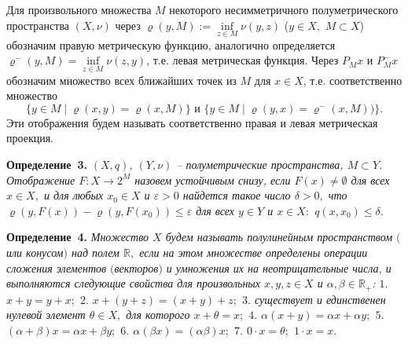 \documentclass{vzmsthesis}
\begin{document}
Для произвольного множества $M$   некоторого    несимметричного   полуметрического пространства $(X,\nu) $ через $\varrho(y,M):=\inf\limits_{z\in M}\nu(y,z)$ ($y\in X,$ $M\subset X$) обозначим правую метрическую функцию, аналогично определяется   $\varrho^-(y,M)=\inf\limits_{z\in M}\nu(z,y)$, т.е. левая метрическая функция.
  Через $P_Mx$ и $P_M^-x$ обозначим множество всех ближайших точек из $M$ для $x\in X$, т.е. соответственно множество $$\{y\in M\mid \varrho(x,y)=\varrho(x,M)\} \mbox{ и }\{y\in M\mid \varrho(y,x)=\varrho^-(x,M))\}.$$ Эти отображения будем называть соответственно правая и левая метрическая проекция.

\textbf{Определение~3.} {\it
 $(X,q)$, $(Y,\nu) $ -- полуметрические
пространства, $M\subset Y$. Отображение $F:X\rightarrow 2^M$
назовем устойчивым снизу, если $F(x)\neq \emptyset$ для всех $x\in
X,$  и для любых $x_0\in X$  и $\varepsilon>0$ найдется такое
число $\delta>0,$ что
$\varrho(y,F(x))-\varrho(y,F(x_0))\leqslant\varepsilon$ для всех
$y\in Y$ и $x\in X:$ $q(x,x_0)\leqslant\delta$.}

\textbf{Определение~4.} {\it
Множество $X$ будем называть полулинейным пространством $($или конусом$)$ над полем $\mathbb{R},$ если на этом множестве определены операции сложения элементов $($векторов$)$ и умножения их на неотрицательные числа, и выполняются следующие свойства для произвольных $x,y,z\in X$ и $\alpha,\beta\in \mathbb{R}_+$:
$1.$ $x+y=y+x;$
$2.$ $x+(y+z)=(x+y)+z;$
$3.$ существует и единственен нулевой элемент $\theta\in X,$ для которого $x+\theta=x;$
$4.$ $\alpha(x+y)=\alpha x+\alpha y;$
$5.$ $(\alpha+\beta)x=\alpha x+\beta y;$
$6.$ $\alpha(\beta x)=(\alpha\beta)x;$
$7.$ $0\cdot x=\theta;$ $1\cdot x=x.$ }
\end{document}
